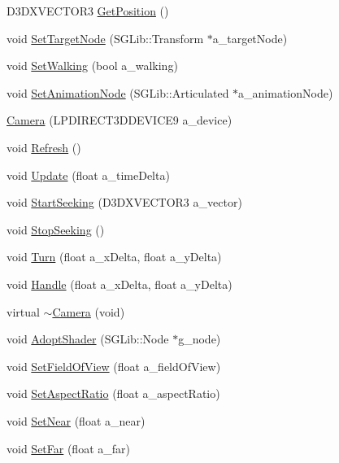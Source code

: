 \begin{DoxyCompactItemize}
\item 
D3DXVECTOR3 \hyperlink{class_feisty_1_1_camera_aa4384bf9913be09d286fbdf7c318f4f5}{GetPosition} ()
\item 
void \hyperlink{class_feisty_1_1_camera_a0e3faebd081573eecbe40c4551926919}{SetTargetNode} (SGLib::Transform $\ast$a\_\-targetNode)
\item 
void \hyperlink{class_feisty_1_1_camera_a8392192850c1bece0cc923001f4479b9}{SetWalking} (bool a\_\-walking)
\item 
void \hyperlink{class_feisty_1_1_camera_a7aca26cc73f4399edd7ede2ae1914cf8}{SetAnimationNode} (SGLib::Articulated $\ast$a\_\-animationNode)
\item 
\hyperlink{class_feisty_1_1_camera_a7480bd2212144072df9186aba48a93e4}{Camera} (LPDIRECT3DDEVICE9 a\_\-device)
\item 
void \hyperlink{class_feisty_1_1_camera_a8729327b8c34fe72d8c6e4964c0d4a6b}{Refresh} ()
\item 
void \hyperlink{class_feisty_1_1_camera_ae633d0619f978c5104f2c8d5dbf10aa5}{Update} (float a\_\-timeDelta)
\item 
void \hyperlink{class_feisty_1_1_camera_a9144982d770e3134fb1b52c82da4669d}{StartSeeking} (D3DXVECTOR3 a\_\-vector)
\item 
void \hyperlink{class_feisty_1_1_camera_ab579f233a45c7a2b629d240c36cdbb61}{StopSeeking} ()
\item 
void \hyperlink{class_feisty_1_1_camera_aea1e6fbd53ad47e302f3fa38535cb3cd}{Turn} (float a\_\-xDelta, float a\_\-yDelta)
\item 
void \hyperlink{class_feisty_1_1_camera_a4a05e648973a0cb47c02b09449b4ae13}{Handle} (float a\_\-xDelta, float a\_\-yDelta)
\item 
virtual \hyperlink{class_feisty_1_1_camera_a8dd5a9f236d04875100a7404ada01edc}{$\sim$Camera} (void)
\item 
void \hyperlink{class_feisty_1_1_camera_a8eb2963d22386fad3a2beba4e3d1871e}{AdoptShader} (SGLib::Node $\ast$g\_\-node)
\item 
void \hyperlink{class_feisty_1_1_camera_aac9f58b9b0f63ce1f354cfef473d08e9}{SetFieldOfView} (float a\_\-fieldOfView)
\item 
void \hyperlink{class_feisty_1_1_camera_a38dcec7dc8214ebb274c71e2dcc2eeb3}{SetAspectRatio} (float a\_\-aspectRatio)
\item 
void \hyperlink{class_feisty_1_1_camera_a58228535280e133cc8a40dc20eed6454}{SetNear} (float a\_\-near)
\item 
void \hyperlink{class_feisty_1_1_camera_ad70999c56c819dcef588e7e93280ebce}{SetFar} (float a\_\-far)

\end{DoxyCompactItemize}
